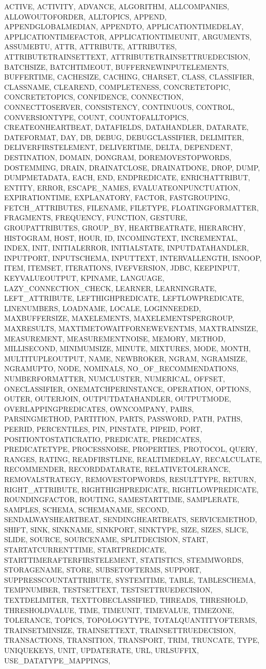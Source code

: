 {{ACTIVE, ACTIVITY, ADVANCE, ALGORITHM, ALLCOMPANIES, ALLOWOUTOFORDER, ALLTOPICS, APPEND, APPENDGLOBALMEDIAN, APPENDTO, APPLICATIONTIMEDELAY, APPLICATIONTIMEFACTOR, APPLICATIONTIMEUNIT, ARGUMENTS, ASSUMEBTU, ATTR, ATTRIBUTE, ATTRIBUTES, ATTRIBUTETRAINSETTEXT, ATTRIBUTETRAINSETTRUEDECISION, BATCHSIZE, BATCHTIMEOUT, BUFFERNEWINPUTELEMENTS, BUFFERTIME, CACHESIZE, CACHING, CHARSET, CLASS, CLASSIFIER, CLASSNAME, CLEAREND, COMPLETENESS, CONCRETETOPIC, CONCRETETOPICS, CONFIDENCE, CONNECTION, CONNECTTOSERVER, CONSISTENCY, CONTINUOUS, CONTROL, CONVERSIONTYPE, COUNT, COUNTOFALLTOPICS, CREATEONHEARTBEAT, DATAFIELDS, DATAHANDLER, DATARATE, DATEFORMAT, DAY, DB, DEBUG, DEBUGCLASSIFIER, DELIMITER, DELIVERFIRSTELEMENT, DELIVERTIME, DELTA, DEPENDENT, DESTINATION, DOMAIN, DONGRAM, DOREMOVESTOPWORDS, DOSTEMMING, DRAIN, DRAINATCLOSE, DRAINATDONE, DROP, DUMP, DUMPMETADATA, EACH, END, ENDPREDICATE, ENRICHATTRIBUT, ENTITY, ERROR, ESCAPE_NAMES, EVALUATEONPUNCTUATION, EXPIRATIONTIME, EXPLANATORY, FACTOR, FASTGROUPING, FETCH_ATTRIBUTES, FILENAME, FILETYPE, FLOATINGFORMATTER, FRAGMENTS, FREQUENCY, FUNCTION, GESTURE, GROUPATTRIBUTES, GROUP_BY, HEARTBEATRATE, HIERARCHY, HISTOGRAM, HOST, HOUR, ID, INCOMINGTEXT, INCREMENTAL, INDEX, INIT, INITIALERROR, INITIALSTATE, INPUTDATAHANDLER, INPUTPORT, INPUTSCHEMA, INPUTTEXT, INTERVALLENGTH, ISNOOP, ITEM, ITEMSET, ITERATIONS, IVEFVERSION, JDBC, KEEPINPUT, KEYVALUEOUTPUT, KPINAME, LANGUAGE, LAZY_CONNECTION_CHECK, LEARNER, LEARNINGRATE, LEFT_ATTRIBUTE, LEFTHIGHPREDICATE, LEFTLOWPREDICATE, LINENUMBERS, LOADNAME, LOCALE, LOGINNEEDED, MAXBUFFERSIZE, MAXELEMENTS, MAXELEMENTSPERGROUP, MAXRESULTS, MAXTIMETOWAITFORNEWEVENTMS, MAXTRAINSIZE, MEASUREMENT, MEASUREMENTNOISE, MEMORY, METHOD, MILLISECOND, MINIMUMSIZE, MINUTE, MIXTURES, MODE, MONTH, MULTITUPLEOUTPUT, NAME, NEWBROKER, NGRAM, NGRAMSIZE, NGRAMUPTO, NODE, NOMINALS, NO_OF_RECOMMENDATIONS, NUMBERFORMATTER, NUMCLUSTER, NUMERICAL, OFFSET, ONECLASSIFIER, ONEMATCHPERINSTANCE, OPERATION, OPTIONS, OUTER, OUTERJOIN, OUTPUTDATAHANDLER, OUTPUTMODE, OVERLAPPINGPREDICATES, OWNCOMPANY, PAIRS, PARSINGMETHOD, PARTITION, PARTS, PASSWORD, PATH, PATHS, PEERID, PERCENTILES, PIN, PINSTATE, PIPEID, PORT, POSITIONTOSTATICRATIO, PREDICATE, PREDICATES, PREDICATETYPE, PROCESSNOISE, PROPERTIES, PROTOCOL, QUERY, RANGES, RATING, READFIRSTLINE, REALTIMEDELAY, RECALCULATE, RECOMMENDER, RECORDDATARATE, RELATIVETOLERANCE, REMOVALSTRATEGY, REMOVESTOPWORDS, RESULTTYPE, RETURN, RIGHT_ATTRIBUTE, RIGHTHIGHPREDICATE, RIGHTLOWPREDICATE, ROUNDINGFACTOR, ROUTING, SAMESTARTTIME, SAMPLERATE, SAMPLES, SCHEMA, SCHEMANAME, SECOND, SENDALWAYSHEARTBEAT, SENDINGHEARTBEATS, SERVICEMETHOD, SHIFT, SINK, SINKNAME, SINKPORT, SINKTYPE, SIZE, SIZES, SLICE, SLIDE, SOURCE, SOURCENAME, SPLITDECISION, START, STARTATCURRENTTIME, STARTPREDICATE, STARTTIMERAFTERFIRSTELEMENT, STATISTICS, STEMMWORDS, STORAGENAME, STORE, SUBSETOFTERMS, SUPPORT, SUPPRESSCOUNTATTRIBUTE, SYSTEMTIME, TABLE, TABLESCHEMA, TEMPNUMBER, TESTSETTEXT, TESTSETTRUEDECISION, TEXTDELIMITER, TEXTTOBECLASSIFIED, THREADS, THRESHOLD, THRESHOLDVALUE, TIME, TIMEUNIT, TIMEVALUE, TIMEZONE, TOLERANCE, TOPICS, TOPOLOGYTYPE, TOTALQUANTITYOFTERMS, TRAINSETMINSIZE, TRAINSETTEXT, TRAINSETTRUEDECISION, TRANSACTIONS, TRANSITION, TRANSPORT, TRIM, TRUNCATE, TYPE, UNIQUEKEYS, UNIT, UPDATERATE, URL, URLSUFFIX, USE_DATATYPE_MAPPINGS, }}
